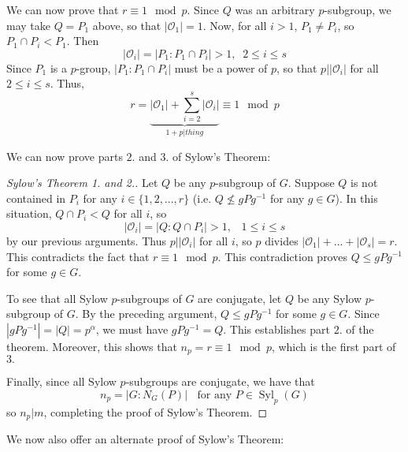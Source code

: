 We can now prove that $r \equiv 1\mod p$. Since $Q$ was an arbitrary $p$-subgroup, we may take $Q = P_1$ above, so that $|\mathcal{O}_1| =1$. Now, for all $i > 1$, $P_1 \neq P_i$, so $P_1 \cap P_i < P_1$. Then \begin{equation*}
    |\mathcal{O}_i| = |P_1:P_1\cap P_i| > 1,\;\; 2 \leq i \leq s
\end{equation*}
Since $P_1$ is a $p$-group, $|P_1:P_1\cap P_i|$ must be a power of $p$, so that $p\vert |\mathcal{O}_i|$ for all $2 \leq i \leq s$. Thus, \begin{equation*}
    r = \underbrace{|\mathcal{O}_1| + \sum\limits_{i=2}^s|\mathcal{O}_i|}_{1+p\vert thing} \equiv 1\mod p
\end{equation*}

We can now prove parts $2.$ and $3.$ of Sylow's Theorem:

\begin{proof}[Sylow's Theorem 1. and 2.]
    Let $Q$ be any $p$-subgroup of $G$. Suppose $Q$ is not contained in $P_i$ for any $i \in \{1,2,...,r\}$ (i.e. $Q\nleq gPg^{-1}$ for any $g \in G$). In this situation, $Q\cap P_i < Q$ for all $i$, so \begin{equation*}
        |\mathcal{O}_i| = |Q:Q\cap P_i| > 1,\;\;\; 1 \leq i \leq s
    \end{equation*}
    by our previous arguments. Thus $p\vert |\mathcal{O}_i|$ for all $i$, so $p$ divides $|\mathcal{O}_1|+...+|\mathcal{O}_s| = r$. This contradicts the fact that $r \equiv 1\mod p$. This contradiction proves $Q \leq gPg^{-1}$ for some $g \in G$.

    To see that all Sylow $p$-subgroups of $G$ are conjugate, let $Q$ be any Sylow $p$-subgroup of $G$. By the preceding argument, $Q\leq gPg^{-1}$ for some $g \in G$. Since $|gPg^{-1}| = |Q| = p^{\alpha}$, we must have $gPg^{-1} = Q$. This establishes part $2.$ of the theorem. Moreover, this shows that $n_p = r \equiv 1 \mod p$, which is the first part of $3.$

    Finally, since all Sylow $p$-subgroups are conjugate, we have that \begin{equation*}
        n_p = |G:N_G(P)| \;\;\text{ for any } P \in \operatorname{Syl}_p(G)
    \end{equation*}
    so $n_p\vert m$, completing the proof of Sylow's Theorem.
\end{proof}

We now also offer an alternate proof of Sylow's Theorem:

